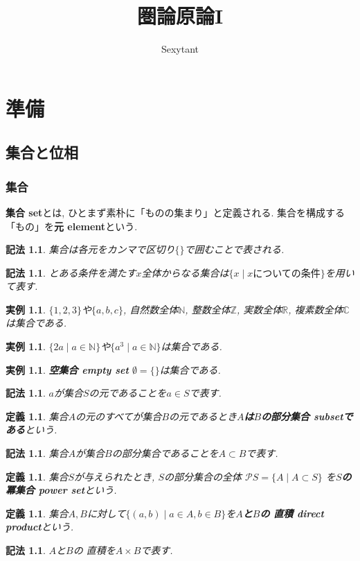 \documentclass[dvipdfmx]{jsbook}
\title{圏論原論I}
\author{Sexytant}
\theoremstyle{plain}
\newtheorem{Def}[thm]{定義}
\newtheorem{Notation}[thm]{記法}
\newtheorem{example}[thm]{実例}
\begin{document}
\setcounter{tocdepth}{2}
\maketitle
\tableofcontents
\newpage
\part{準備}
\chapter{集合と位相}
\section{集合}
{\bf 集合 set}とは, ひとまず素朴に「ものの集まり」と定義される. 集合を構成する「もの」を{\bf 元 element}という.
\begin{Notation}
集合は各元をカンマで区切り$\{\}$で囲むことで表される. 
\end{Notation}
\begin{Notation}
とある条件を満たす$x$全体からなる集合は$\{x\mid x\text{についての条件}\}$を用いて表す.
\end{Notation}
\begin{example}$\{1,2,3\}$や$\{a,b,c\}$, 自然数全体$\mathbb{N}$, 整数全体$\mathbb{Z}$, 実数全体$\mathbb{R}$, 複素数全体$\mathbb{C}$は集合である.
\end{example}
\begin{example}
$\{2a\mid a\in\mathbb{N}\}$や$\{a^3\mid a\in\mathbb{N}\}$は集合である.
\end{example}
\begin{example}
{\bf 空集合 empty set} $\emptyset=\{\}$は集合である.
\end{example}
\begin{Notation}
$a$が集合$S$の元であることを$a\in S$で表す.
\end{Notation}
\begin{Def}
集合$A$の元のすべてが集合$B$の元であるとき{\bf $A$は$B$の部分集合 subsetである}という.  
\end{Def}
\begin{Notation}
集合$A$が集合$B$の部分集合であることを$A\subset B$で表す.
\end{Notation}
\begin{Def}
集合$S$が与えられたとき, $S$の部分集合の全体
$\mathscr{P}S=\{A\mid A\subset S\}$
を{\bf $S$の冪集合 power set}という.
\end{Def}

\begin{Def}
集合$A,B$に対して$\{(a,b)\mid a\in A, b\in B\}$を{\bf $A$と$B$の
直積 direct product}という.
\end{Def}
\begin{Notation}
$A$と$B$の
直積を$A\times B$で表す.
\end{Notation}
\end{document}
